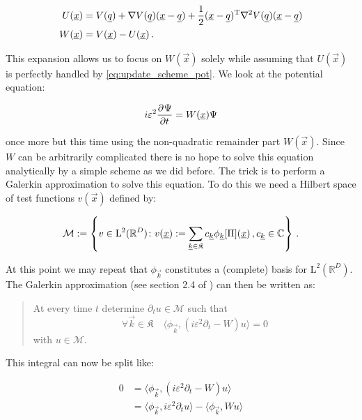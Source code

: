 \begin{align*}
  U(\underline{x}) & = V(\underline{q}) + \nabla V(\underline{q}) (\underline{x}-\underline{q})
                 + \frac{1}{2} (\underline{x}-\underline{q}){}^{\textnormal{T}} \nabla^2 V(\underline{q}) (\underline{x}-\underline{q}) \\
  W(\underline{x}) & = V(\underline{x}) - U(\underline{x}) \,.
\end{align*}

This expansion allows us to focus on $W(\vec{x})$ solely while assuming that
$U(\vec{x})$ is perfectly handled by \eqref{eq:update_scheme_pot}. We look at
the potential equation:

\begin{equation*}
  i \varepsilon^2  \frac{\partial^{}\Psi}{\partial t^{}} = W(\underline{x}) \Psi
\end{equation*}

once more but this time using the non-quadratic remainder part $W(\vec{x})$.
Since $W$ can be arbitrarily complicated there is no hope to solve this
equation analytically by a simple scheme as we did before. The trick is to
perform a Galerkin approximation to solve this equation. To do this we need
a Hilbert space of test functions $v(\vec{x})$ defined by:

\begin{equation}
  \mathcal{M} := \left\{ v \in \mathrm{L}^2(\mathbb{R}^D) \colon
                              v(\underline{x}) := \sum_{\underline{k}\in\mathfrak{K}}
                                                 c_{\underline{k}} \phi_{\underline{k}}[\Pi](\underline{x})
                         \,, c_{\underline{k}} \in \mathbb{C}
                      \right\} \,.
\end{equation}

At this point we may repeat that $\phi_{\vec{k}}$ constitutes a (complete) basis
for $\mathrm{L}^2(\mathbb{R}^D)$. The Galerkin approximation (see section 2.4 of
\cite{FGL_semiclassical_dynamics}) can then be written as:

\begin{quotation}
  \noindent
  At every time $t$ determine $\partial_t u \in \mathcal{M}$ such that
  \begin{equation*}
    \forall \vec{k} \in \mathfrak{K} \quad \langle \phi_{\vec{k}}, (i\varepsilon^2\partial_t -W) u \rangle = 0
  \end{equation*}
  with $u \in \mathcal{M}$.
\end{quotation}

This integral can now be split like:

\begin{align*}
  0 & = \langle \phi_{\vec{k}}, (i\varepsilon^2\partial_t -W) u \rangle \\
    & = \langle \phi_{\vec{k}}, i\varepsilon^2\partial_t u \rangle - \langle \phi_{\vec{k}}, W u \rangle
\end{align*}

